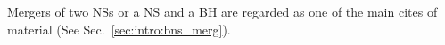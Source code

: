 Mergers of two \acp{NS} or a \ac{NS} and a \ac{BH} are regarded as one of the main cites 
of \rproc{} material (See Sec.~\ref{sec:intro:bns_merg}). 
%


